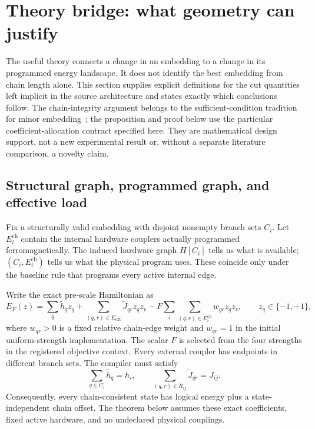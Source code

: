 \section{Theory bridge: what geometry can justify}
\label{theory:bridge}

The useful theory connects a change in an embedding to a change in its programmed energy landscape. It does not identify the best embedding from chain length alone. This section supplies explicit definitions for the cut quantities left implicit in the source architecture and states exactly which conclusions follow. The chain-integrity argument belongs to the sufficient-condition tradition for minor embedding~\cite{choi2008}; the proposition and proof below use the particular coefficient-allocation contract specified here. They are mathematical design support, not a new experimental result or, without a separate literature comparison, a novelty claim.

\subsection{Structural graph, programmed graph, and effective load}
\label{theory:objects}

Fix a structurally valid embedding with disjoint nonempty branch sets $C_i$. Let $E_i^{\mathrm{ch}}$ contain the internal hardware couplers actually programmed ferromagnetically. The induced hardware graph $H[C_i]$ tells us what is available; $(C_i,E_i^{\mathrm{ch}})$ tells us what the physical program uses. These coincide only under the baseline rule that programs every active internal edge.

Write the exact pre-scale Hamiltonian as
\begin{equation}
 E_F(z)=\sum_q \widetilde h_q z_q+
 \sum_{(q,r)\in E_{\mathrm{ext}}}\widetilde J_{qr}z_qz_r
 -F\sum_i\sum_{(q,r)\in E_i^{\mathrm{ch}}}w_{qr}z_qz_r,
 \qquad z_q\in\{-1,+1\},
 \label{theory:physical}
\end{equation}
where $w_{qr}>0$ is a fixed relative chain-edge weight and $w_{qr}=1$ in the initial uniform-strength implementation. The scalar $F$ is selected from the four strengths in the registered objective context. Every external coupler has endpoints in different branch sets. The compiler must satisfy
\[
 \sum_{q\in C_i}\widetilde h_q=h_i,
 \qquad
 \sum_{(q,r)\in R_{ij}}\widetilde J_{qr}=J_{ij}.
\]
Consequently, every chain-consistent state has logical energy plus a state-independent chain offset. The theorem below assumes these exact coefficients, fixed active hardware, and no undeclared physical couplings.

